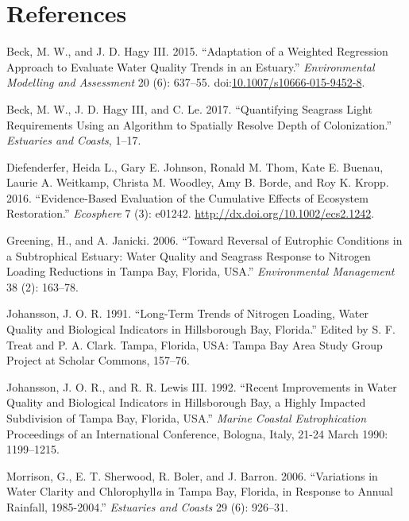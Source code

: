 \documentclass[]{article}
\begin{document}
\section*{References}\label{references}

\hypertarget{refs}{}
\hypertarget{ref-Beck15}{}
Beck, M. W., and J. D. Hagy III. 2015. ``Adaptation of a Weighted
Regression Approach to Evaluate Water Quality Trends in an Estuary.''
\emph{Environmental Modelling and Assessment} 20 (6): 637--55.
doi:\href{https://doi.org/10.1007/s10666-015-9452-8}{10.1007/s10666-015-9452-8}.

\hypertarget{ref-Beck17c}{}
Beck, M. W., J. D. Hagy III, and C. Le. 2017. ``Quantifying Seagrass
Light Requirements Using an Algorithm to Spatially Resolve Depth of
Colonization.'' \emph{Estuaries and Coasts}, 1--17.

\hypertarget{ref-Diefenderfer16}{}
Diefenderfer, Heida L., Gary E. Johnson, Ronald M. Thom, Kate E. Buenau,
Laurie A. Weitkamp, Christa M. Woodley, Amy B. Borde, and Roy K. Kropp.
2016. ``Evidence-Based Evaluation of the Cumulative Effects of Ecosystem
Restoration.'' \emph{Ecosphere} 7 (3): e01242.
\url{http://dx.doi.org/10.1002/ecs2.1242}.

\hypertarget{ref-Greening06}{}
Greening, H., and A. Janicki. 2006. ``Toward Reversal of Eutrophic
Conditions in a Subtrophical Estuary: Water Quality and Seagrass
Response to Nitrogen Loading Reductions in Tampa Bay, Florida, USA.''
\emph{Environmental Management} 38 (2): 163--78.

\hypertarget{ref-Johansson91}{}
Johansson, J. O. R. 1991. ``Long-Term Trends of Nitrogen Loading, Water
Quality and Biological Indicators in Hillsborough Bay, Florida.'' Edited
by S. F. Treat and P. A. Clark. Tampa, Florida, USA: Tampa Bay Area
Study Group Project at Scholar Commons, 157--76.

\hypertarget{ref-Johansson92}{}
Johansson, J. O. R., and R. R. Lewis III. 1992. ``Recent Improvements in
Water Quality and Biological Indicators in Hillsborough Bay, a Highly
Impacted Subdivision of Tampa Bay, Florida, USA.'' \emph{Marine Coastal
Eutrophication} Proceedings of an International Conference, Bologna,
Italy, 21-24 March 1990: 1199--1215.

\hypertarget{ref-Morrison06}{}
Morrison, G., E. T. Sherwood, R. Boler, and J. Barron. 2006.
``Variations in Water Clarity and Chlorophyll\emph{a} in Tampa Bay,
Florida, in Response to Annual Rainfall, 1985-2004.'' \emph{Estuaries
and Coasts} 29 (6): 926--31.
\end{document}
